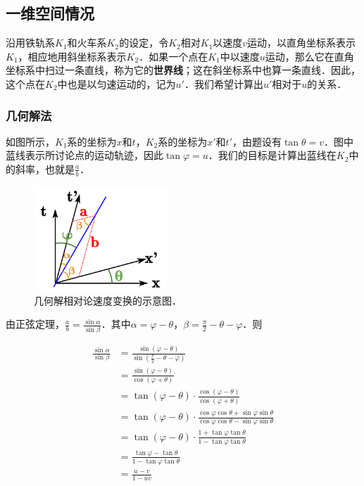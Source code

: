 
\subsection{一维空间情况}

沿用铁轨系$K_1$和火车系$K_2$的设定，令$K_2$相对$K_1$以速度$v$运动，以直角坐标系表示$K_1$，相应地用斜坐标系表示$K_2$．如果一个点在$K_1$中以速度$u$运动，那么它在直角坐标系中扫过一条直线，称为它的\textbf{世界线}；这在斜坐标系中也算一条直线．因此，这个点在$K_2$中也是以匀速运动的，记为$u'$．我们希望计算出$u'$相对于$u$的关系．


\subsubsection{几何解法}

如图所示，$K_1$系的坐标为$x$和$t$，$K_2$系的坐标为$x'$和$t'$，由题设有$\tan{\theta}=v$．图中蓝线表示所讨论点的运动轨迹，因此$\tan{\varphi}=u$．我们的目标是计算出蓝线在$K_2$中的斜率，也就是$\frac{a}{b}$．


\begin{figure}[ht]
\centering
\includegraphics[width=5cm]{./figures/RelVel_1.pdf}
\caption{几何解相对论速度变换的示意图．} \label{RelVel_fig1}
\end{figure}

由正弦定理，$\frac{a}{b}=\frac{\sin{\alpha}}{\sin{\beta}}$．其中$\alpha=\varphi-\theta$，$\beta=\frac{\pi}{2}-\theta-\varphi$．则

\begin{equation}\label{RelVel_eq1}
\begin{aligned}
\frac{\sin{\alpha}}{\sin{\beta}}&=\frac{\sin{(\varphi-\theta)}}{\sin{(\frac{\pi}{2}-\theta-\varphi)}}\\
&=\frac{\sin{(\varphi-\theta)}}{\cos{(\varphi+\theta)}}\\
&=\tan(\varphi-\theta)\cdot\frac{\cos(\varphi-\theta)}{\cos(\varphi+\theta)}\\
&=\tan(\varphi-\theta)\cdot\frac{\cos\varphi\cos\theta+\sin\varphi\sin\theta}{\cos\varphi\cos\theta-\sin\varphi\sin\theta}\\
&=\tan(\varphi-\theta)\cdot\frac{1+\tan\varphi\tan\theta}{1-\tan\varphi\tan\theta}\\
&=\frac{\tan\varphi-\tan\theta}{1-\tan\varphi\tan\theta}\\
&=\frac{u-v}{1-uv}
\end{aligned}
\end{equation}

